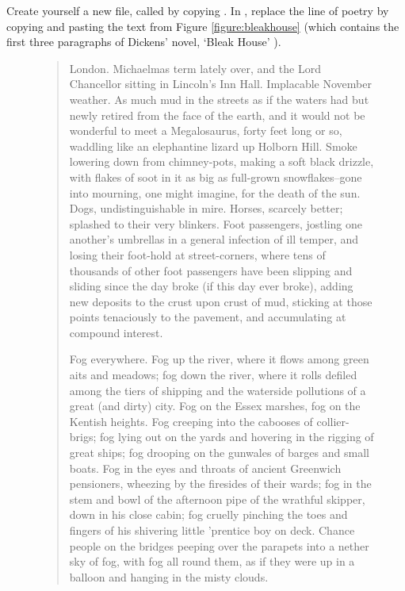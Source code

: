 \begin{refsection}
\label{sec:exercise-2}

 Create yourself a new file, called  by copying . In , replace the line of poetry by copying and pasting the text from Figure \ref{figure:bleakhouse} (which contains the first three paragraphs of Dickens' novel, `Bleak House' \citep{dickens1852}).

\begin{figure}[tbp]

\begin{quote}

  \itshape
  \raggedright
  
London. Michaelmas term lately over, and the Lord Chancellor sitting
in Lincoln's Inn Hall. Implacable November weather. As much mud in
the streets as if the waters had but newly retired from the face of
the earth, and it would not be wonderful to meet a Megalosaurus,
forty feet long or so, waddling like an elephantine lizard up Holborn
Hill. Smoke lowering down from chimney-pots, making a soft black
drizzle, with flakes of soot in it as big as full-grown
snowflakes--gone into mourning, one might imagine, for the death of
the sun. Dogs, undistinguishable in mire. Horses, scarcely better;
splashed to their very blinkers. Foot passengers, jostling one
another's umbrellas in a general infection of ill temper, and losing
their foot-hold at street-corners, where tens of thousands of other
foot passengers have been slipping and sliding since the day broke
(if this day ever broke), adding new deposits to the crust upon crust
of mud, sticking at those points tenaciously to the pavement, and
accumulating at compound interest.



Fog everywhere. Fog up the river, where it flows among green aits and
meadows; fog down the river, where it rolls defiled among the tiers
of shipping and the waterside pollutions of a great (and dirty) city.
Fog on the Essex marshes, fog on the Kentish heights. Fog creeping
into the cabooses of collier-brigs; fog lying out on the yards and
hovering in the rigging of great ships; fog drooping on the gunwales
of barges and small boats. Fog in the eyes and throats of ancient
Greenwich pensioners, wheezing by the firesides of their wards; fog
in the stem and bowl of the afternoon pipe of the wrathful skipper,
down in his close cabin; fog cruelly pinching the toes and fingers of
his shivering little 'prentice boy on deck. Chance people on the
bridges peeping over the parapets into a nether sky of fog, with fog
all round them, as if they were up in a balloon and hanging in the
misty clouds.


\end{quote}
\end{figure}
\end{refsection}

